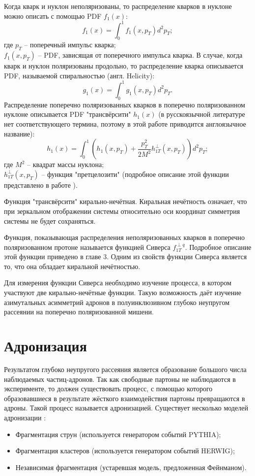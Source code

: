 \documentclass{extreport}
\begin{document}
Когда кварк и нуклон неполяризованы, то распределение кварков в нуклоне можно описать с помощью PDF $f_1(x)$:
\begin{equation}
	f_1(x) = \int_{0}^{1} f_1(x, p_T) d^2 p_T;
\end{equation}
где $p_T$ -- поперечный импульс кварка; \\
$f_1(x, p_T)$ -- PDF, зависящая от поперечного импульса кварка.
В случае, когда кварк и нуклон поляризованы продольно, то распределение кварка описывается PDF, называемой спиральностью (англ. Helicity):
\begin{equation}
	g_1(x) = \int_{0}^{1} g_1(x, p_T) d^2 p_T.
\end{equation}
Распределение поперечно поляризованных кварков в поперечно поляризованном нуклоне описывается PDF "трансвёрсити" $h_1(x)$ (в русскоязычной литературе нет соответствующего термина, поэтому в этой работе приводится англоязычное название):
\begin{equation}
	h_1(x) = \int_{0}^{1} (h_1(x, p_T) + \frac{p_T^2}{2M^2} h_{1T}^{\perp}(x, p_T) )d^2 p_T;
\end{equation} 
где $M^2$ -- квадрат массы нуклона; \\
$ h_{1T}^{\perp}(x, p_T)$ -- функция "претцелозити" (подробное описание этой функции представлено в работе \cite{Chai_2019}).


Функция "трансвёрсити" кирально-нечётная. Киральная нечётность означает, что при зеркальном отображении системы относительно оси координат симметрия системы не будет сохраняться. 

Функция, показывающая распределения неполяризованных кварков в поперечно поляризованном протоне называется функцией Сиверса $f_{1T}^{\perp q}$. Подробное описание этой функции приведено в главе 3. Одним из свойств функции Сиверса является то, что она обладает киральной нечётностью.

Для измерения функции Сиверса необходимо изучение процесса, в котором участвуют две кирально-нечётные функции. Такую возможность даёт изучение азимутальных асимметрий адронов в полуинклюзивном глубоко неупругом рассеянии на поперечно поляризованной мишени. 


\section{Адронизация}
Результатом глубоко неупругого рассеяния является образование большого числа наблюдаемых частиц-адронов. Так как свободные партоны не наблюдаются в эксперименте, то должен существовать процесс, с помощью которого образовавшиеся в результате жёсткого взаимодействия партоны превращаются в адроны. Такой процесс называется адронизацией. Существует несколько моделей адронизации  \cite{Hadronization}:
\begin{itemize}
\item Фрагментация струн (используется генератором событий PYTHIA);
\item Фрагментация кластеров (используется генератором событий HERWIG);
\item Независимая фрагментация (устаревшая модель, предложенная Фейнманом).
\end{itemize}
 
\end{document}

